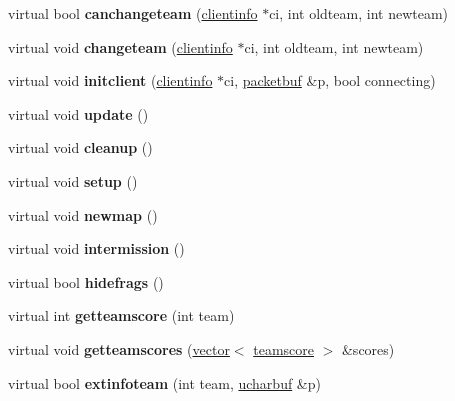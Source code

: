 \begin{DoxyCompactItemize}
\mbox{\label{structserver_1_1servmode_a713bd2ea5354d83cbb5347b6b27fa173}} 
virtual bool {\bfseries canchangeteam} (\hyperlink{structserver_1_1clientinfo}{clientinfo} $\ast$ci, int oldteam, int newteam)
\item 
\mbox{\label{structserver_1_1servmode_a5e84ce3eed54475288adbbd8f7378465}} 
virtual void {\bfseries changeteam} (\hyperlink{structserver_1_1clientinfo}{clientinfo} $\ast$ci, int oldteam, int newteam)
\item 
\mbox{\label{structserver_1_1servmode_a6220e24bd22718275c7a22cb67cc6489}} 
virtual void {\bfseries initclient} (\hyperlink{structserver_1_1clientinfo}{clientinfo} $\ast$ci, \hyperlink{structpacketbuf}{packetbuf} \&p, bool connecting)
\item 
\mbox{\label{structserver_1_1servmode_afc5c72238e635713477af11e0e37ce3b}} 
virtual void {\bfseries update} ()
\item 
\mbox{\label{structserver_1_1servmode_a36fa58660b39485e097e27b780f29021}} 
virtual void {\bfseries cleanup} ()
\item 
\mbox{\label{structserver_1_1servmode_a932eddc330334e2313b66995e393a06f}} 
virtual void {\bfseries setup} ()
\item 
\mbox{\label{structserver_1_1servmode_aff7ae36f8f5ccb1ef2e47496f042573c}} 
virtual void {\bfseries newmap} ()
\item 
\mbox{\label{structserver_1_1servmode_ab85ae5f3ebd5fd80ab1cb302420ae412}} 
virtual void {\bfseries intermission} ()
\item 
\mbox{\label{structserver_1_1servmode_a45ae3bc5922d024b7a2947c8dc2e744f}} 
virtual bool {\bfseries hidefrags} ()
\item 
\mbox{\label{structserver_1_1servmode_a7a55802c3911aaca5728dbc77edbf44c}} 
virtual int {\bfseries getteamscore} (int team)
\item 
\mbox{\label{structserver_1_1servmode_a30de1ce83db65674ef2d8e2bafe51f03}} 
virtual void {\bfseries getteamscores} (\hyperlink{structvector}{vector}$<$ \hyperlink{structteamscore}{teamscore} $>$ \&scores)
\item 
\mbox{\label{structserver_1_1servmode_a8bb98ac7373c7d667e42d39cae6cef01}} 
virtual bool {\bfseries extinfoteam} (int team, \hyperlink{structdatabuf}{ucharbuf} \&p)
\end{DoxyCompactItemize}


